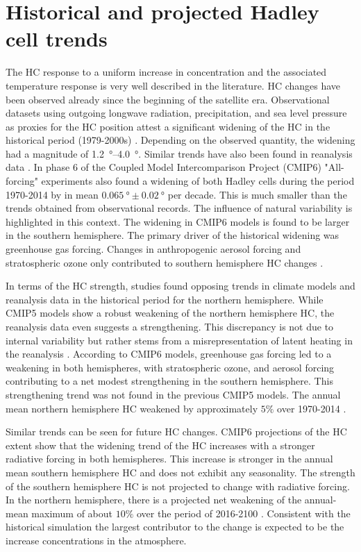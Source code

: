 \section{Historical and projected Hadley cell trends} \label{sec:HC_proj}
The HC response to a uniform increase in \CO{} concentration and the associated temperature response is very well described in the literature. HC changes have been observed already since the beginning of the satellite era. Observational datasets using outgoing longwave radiation, precipitation, and sea level pressure as proxies for the HC position attest a significant widening of the HC in the historical period (1979-2000s) \parencite{huObservationalEvidencePoleward2011}. Depending on the observed quantity, the widening had a magnitude of \SIrange{1.2}{4.0}{\degree}. Similar trends have also been found in reanalysis data \parencite{huObservedPolewardExpansion2007}. 
In phase 6 of the Coupled Model Intercomparison Project (CMIP6) "All-forcing" experiments also found a widening of both Hadley cells during the period 1970-2014 by in mean $\SI{0.065}{\degree} \pm \SI{0.02}{\degree}$ per decade. This is much smaller than the trends obtained from observational records. The influence of natural variability is highlighted in this context. The widening in CMIP6 models is found to be larger in the southern hemisphere. The primary driver of the historical widening was greenhouse gas forcing. Changes in anthropogenic aerosol forcing and stratospheric ozone only contributed to southern hemisphere HC changes \parencite{xiaComparisonTrendsHadley2020}.

In terms of the HC strength, studies found opposing trends in climate models and reanalysis data in the historical period for the northern hemisphere. While CMIP5 models show a robust weakening of the northern hemisphere HC, the reanalysis data even suggests a strengthening. This discrepancy is not due to internal variability but rather stems from a misrepresentation of latent heating in the reanalysis \parencite{chemkeOppositeTropicalCirculation2019}. According to CMIP6 models, greenhouse gas forcing led to a weakening in both hemispheres, with stratospheric ozone, and aerosol forcing contributing to a net modest strengthening in the southern hemisphere. This strengthening trend was not found in the previous CMIP5 models. The annual mean northern hemisphere HC weakened by approximately $5\%$ over 1970-2014 \parencite{xiaComparisonTrendsHadley2020}. 

Similar trends can be seen for future HC changes. CMIP6 projections of the HC extent show that the widening trend of the HC increases with a stronger radiative forcing in both hemispheres. This increase is stronger in the annual mean southern hemisphere HC and does not exhibit any seasonality. The strength of the southern hemisphere HC is not projected to change with radiative forcing. In the northern hemisphere, there is a projected net weakening of the annual-mean maximum of about $10\%$ over the period of 2016-2100 \parencite{xiaComparisonTrendsHadley2020}. Consistent with the historical simulation the largest contributor to the change is expected to be the increase \CO{} concentrations in the atmosphere. 
